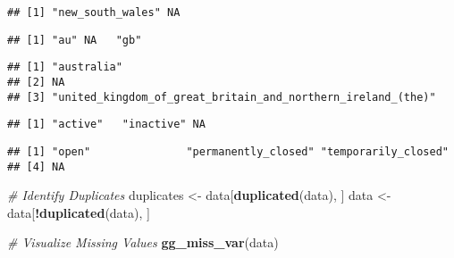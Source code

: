 \documentclass[
]{article}
\newenvironment{Shaded}{\begin{snugshade}}{\end{snugshade}}
\newcommand{\CommentTok}[1]{\textcolor[rgb]{0.56,0.35,0.01}{\textit{#1}}}
\newcommand{\FunctionTok}[1]{\textcolor[rgb]{0.13,0.29,0.53}{\textbf{#1}}}
\newcommand{\NormalTok}[1]{#1}
\newcommand{\OtherTok}[1]{\textcolor[rgb]{0.56,0.35,0.01}{#1}}
\newcommand{\SpecialCharTok}[1]{\textcolor[rgb]{0.81,0.36,0.00}{\textbf{#1}}}
\begin{document}
\begin{verbatim}
## [1] "new_south_wales" NA
\end{verbatim}

\begin{Shaded}
\end{Shaded}

\begin{verbatim}
## [1] "au" NA   "gb"
\end{verbatim}

\begin{Shaded}
\end{Shaded}

\begin{verbatim}
## [1] "australia"                                                 
## [2] NA                                                          
## [3] "united_kingdom_of_great_britain_and_northern_ireland_(the)"
\end{verbatim}

\begin{Shaded}
\end{Shaded}

\begin{verbatim}
## [1] "active"   "inactive" NA
\end{verbatim}

\begin{Shaded}
\end{Shaded}

\begin{verbatim}
## [1] "open"               "permanently_closed" "temporarily_closed"
## [4] NA
\end{verbatim}

\begin{Shaded}
\begin{Highlighting}[]
\CommentTok{\# Identify Duplicates}
\NormalTok{duplicates }\OtherTok{\textless{}{-}}\NormalTok{ data[}\FunctionTok{duplicated}\NormalTok{(data), ]}
\NormalTok{data }\OtherTok{\textless{}{-}}\NormalTok{ data[}\SpecialCharTok{!}\FunctionTok{duplicated}\NormalTok{(data), ]}

\CommentTok{\# Visualize Missing Values}
\FunctionTok{gg\_miss\_var}\NormalTok{(data)}
\end{Highlighting}
\end{Shaded}
\end{document}
